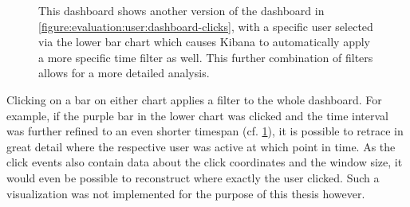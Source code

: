 \begin{figure}[t]
        \caption[Click dashboard with a more specific time filter and a specific user.]{
        This dashboard shows another version of the dashboard in \cref{figure:evaluation:user:dashboard-clicks}, with a specific user selected via the lower bar chart which causes Kibana to automatically apply a more specific time filter as well.
	This further combination of filters allows for a more detailed analysis.
        }
        \label{figure:evaluation:user:dashboard-clicks-zoom-user}
\end{figure}

Clicking on a bar on either chart applies a filter to the whole dashboard.
For example, if the purple bar in the lower chart was clicked and the time interval was further refined to an even shorter timespan (cf. \cref{figure:evaluation:user:dashboard-clicks-zoom-user}), it is possible to retrace in great detail where the respective user was active at which point in time.
As the click events also contain data about the click coordinates and the window size, it would even be possible to reconstruct where exactly the user clicked.
Such a visualization was not implemented for the purpose of this thesis however.

